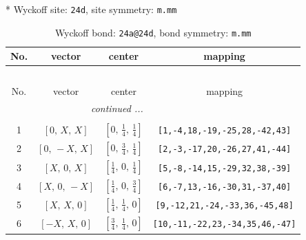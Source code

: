 \documentclass[fleqn,8pt]{jsarticle}
\begin{document}
* Wyckoff site: {\tt 24d}, site symmetry: {\tt m.mm}
\renewcommand{\arraystretch}{1.2}
\begin{longtable}{cccc}
\caption{Wyckoff bond: {\tt 24a@24d}, bond symmetry: {\tt m.mm}}
 \\
 \hline \hline
No. & vector & center & mapping \\ \hline \endfirsthead

\multicolumn{3}{l}{\tablename\ \thetable{}} \\
 \hline \hline
No. & vector & center & mapping \\ \hline \endhead

 \hline \hline
\multicolumn{3}{r}{\footnotesize\it continued ...} \\ \endfoot

 \hline \hline
\multicolumn{3}{r}{} \\ \endlastfoot

1 & $\left[ 0,\, X,\, X \right]$ & $\left[ 0,\, \frac{1}{4},\, \frac{1}{4} \right]$ & {\tt [1,-4,18,-19,-25,28,-42,43]} \\ \hline
2 & $\left[ 0,\, - X,\, X \right]$ & $\left[ 0,\, \frac{3}{4},\, \frac{1}{4} \right]$ & {\tt [2,-3,-17,20,-26,27,41,-44]} \\ \hline
3 & $\left[ X,\, 0,\, X \right]$ & $\left[ \frac{1}{4},\, 0,\, \frac{1}{4} \right]$ & {\tt [5,-8,-14,15,-29,32,38,-39]} \\ \hline
4 & $\left[ X,\, 0,\, - X \right]$ & $\left[ \frac{1}{4},\, 0,\, \frac{3}{4} \right]$ & {\tt [6,-7,13,-16,-30,31,-37,40]} \\ \hline
5 & $\left[ X,\, X,\, 0 \right]$ & $\left[ \frac{1}{4},\, \frac{1}{4},\, 0 \right]$ & {\tt [9,-12,21,-24,-33,36,-45,48]} \\ \hline
6 & $\left[ - X,\, X,\, 0 \right]$ & $\left[ \frac{3}{4},\, \frac{1}{4},\, 0 \right]$ & {\tt [10,-11,-22,23,-34,35,46,-47]} \\
\end{longtable}
\renewcommand{\arraystretch}{1.2}
\end{document}

